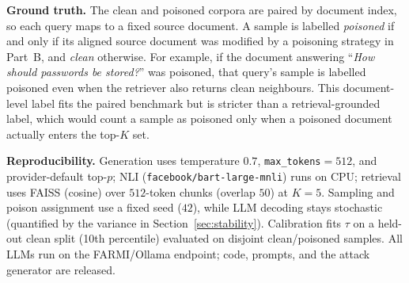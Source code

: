 \textbf{Ground truth.} The clean and poisoned corpora are paired by document index, so each query maps to a fixed source document. A sample is labelled \emph{poisoned} if and only if its aligned source document was modified by a poisoning strategy in Part~B, and \emph{clean} otherwise. For example, if the document answering ``\emph{How should passwords be stored?}'' was poisoned, that query's sample is labelled poisoned even when the retriever also returns clean neighbours. This document-level label fits the paired benchmark but is stricter than a retrieval-grounded label, which would count a sample as poisoned only when a poisoned document actually enters the top-$K$ set.

\textbf{Reproducibility.} Generation uses temperature $0.7$, \texttt{max\_tokens}$=512$, and provider-default top-$p$; NLI (\texttt{facebook/bart-large-mnli}) runs on CPU; retrieval uses FAISS (cosine) over $512$-token chunks (overlap $50$) at $K{=}5$. Sampling and poison assignment use a fixed seed ($42$), while LLM decoding stays stochastic (quantified by the variance in Section~\ref{sec:stability}). Calibration fits $\tau$ on a held-out clean split (10th percentile) evaluated on disjoint clean/poisoned samples. All LLMs run on the FARMI/Ollama endpoint; code, prompts, and the attack generator are released.
